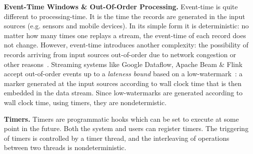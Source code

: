 \documentclass[sigconf]{acmart}
\newcommand{\para}[1]{\vspace{1mm}\noindent\textbf{#1.}}
\begin{document}
\para{Event-Time Windows \& Out-Of-Order Processing} Event-time is quite different to processing-time. It is the time the records are generated in the input sources (e.g. sensors and mobile devices). In its simple form it is deterministic: no matter how many times one replays a stream, the event-time of each record does not change. However, event-time introduces another complexity: the possibility of records arriving from input sources out-of-order due to network congestion or other reasons~\cite{srivastava2004flexible}. Streaming systems like Google Dataflow, Apache Beam \& Flink accept out-of-order events up to a \emph{lateness bound} based on a low-watermark~\cite{li2008out}: a marker generated  at the input sources according to wall clock time that is then embedded in the data stream. 
Since low-watermarks are generated according to wall clock time, using timers, they are nondetermistic.

\para{Timers} Timers are programmatic hooks which can be set to execute at some point in the future. Both the system and users can register timers. The triggering of timers is controlled by a timer thread, and the interleaving of operations between two threads is nondeterministic.

\end{document}
